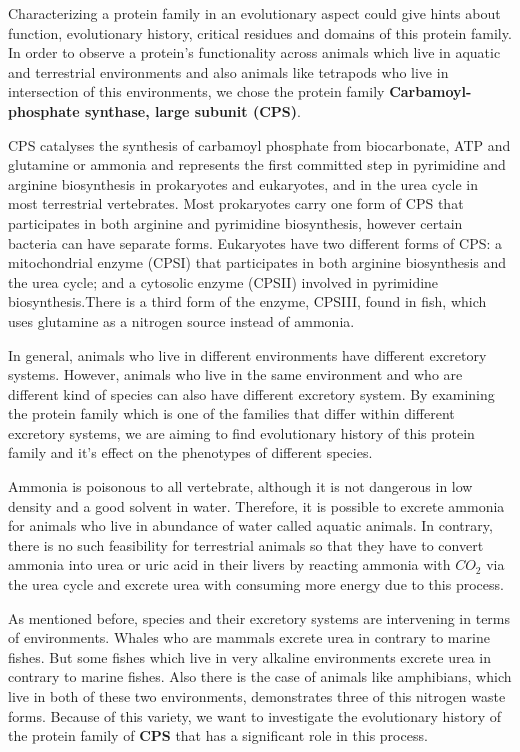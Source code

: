 \documentclass[a4paper]{article}
\begin{document}
Characterizing a protein family in an evolutionary aspect could give hints about function, evolutionary history, critical residues and domains of this protein family. In order to observe a protein's functionality across animals which live in aquatic and terrestrial environments and also animals like tetrapods who live in intersection of this environments, we chose the protein family \textbf{Carbamoyl-phosphate synthase, large subunit (CPS)}.
\par
\smallskip
CPS catalyses the synthesis of carbamoyl phosphate from biocarbonate, ATP and glutamine  or ammonia and represents the first committed step in pyrimidine and arginine biosynthesis in prokaryotes and eukaryotes, and in the urea cycle in most terrestrial vertebrates.
Most prokaryotes carry one form of CPS that participates in both arginine and pyrimidine biosynthesis, however certain bacteria can have separate forms. Eukaryotes have two different forms of CPS: a mitochondrial enzyme (CPSI) that participates in both arginine biosynthesis and the urea cycle; and a cytosolic enzyme (CPSII) involved in pyrimidine biosynthesis.There is a third form of the enzyme, CPSIII, found in fish, which uses glutamine as a nitrogen source instead of ammonia.
\par
\smallskip
In general, animals who live in different environments have different excretory systems. However, animals who live in the same environment and who are different kind of species can also have different excretory system. By examining the protein family which is one of the families that differ within different excretory systems, we are aiming to find evolutionary history of this protein family and it's effect on the phenotypes of different species.
\par
\smallskip
Ammonia is poisonous to all vertebrate, although it is not dangerous in low density and a good solvent in water. Therefore, it is possible to excrete ammonia for animals who  live in abundance of water called aquatic animals. In contrary, there is no such feasibility for terrestrial animals so that they have to convert ammonia into urea or uric acid in their livers by reacting ammonia with $CO_2$ via the urea cycle and excrete urea with consuming more energy due to this process.
\par
\smallskip
As mentioned before, species and their excretory systems are intervening in terms of environments. Whales who are mammals excrete urea in contrary to marine fishes. But some fishes which live in very alkaline environments excrete urea in contrary to marine fishes. Also there is the case of animals like amphibians, which live in both of these two environments, demonstrates three of this nitrogen waste forms. Because of this variety, we want to investigate the evolutionary history of the protein family of \textbf{CPS} that has a significant role in this process. 
\end{document}
